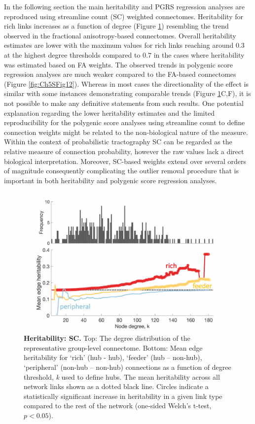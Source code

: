\newpage
In the following section the main heritability and PGRS regression analyses are reproduced using streamline count (SC) weighted connectomes. Heritability for rich links increases as a function of degree (Figure \ref{fig:Ch5SFig11}) resembling the trend observed in the fractional anisotropy-based connectomes. Overall heritability estimates are lower with the maximum values for rich links reaching around $0.3$ at the highest degree thresholds compared to $0.7$ in the cases where heritability was estimated based on FA weights. The observed trends in polygenic score regression analyses are much weaker compared to the FA-based connectomes (Figure \ref{fig:Ch5SFig12}). Whereas in most cases the directionality of the effect is similar with some instances demonstrating comparable trends (Figure \ref{fig:Ch5SFig11}C,F), it is not possible to make any definitive statements from such results. One potential explanation regarding the lower heritability estimates and the limited reproducibility for the polygenic score analyses using streamline count to define connection weights might be related to the non-biological nature of the measure. Within the context of probabilistic tractography SC can be regarded as the relative measure of connection probability, however the raw values lack a direct biological interpretation. Moreover, SC-based weights extend over several orders of magnitude consequently complicating the outlier removal procedure that is important in both heritability and polygenic score regression analyses. 

\begin{figure}[h!]
\begin{center}
\includegraphics[width=1\textwidth]{Chapter5/SFigure11.pdf}%
\end{center}
\caption{\textbf{Heritability: SC.} 
Top: The degree distribution of the representative group-level connectome. Bottom: Mean edge heritability for `rich' (hub - hub), `feeder' (hub – non-hub), `peripheral' (non-hub – non-hub) connections as a function of degree threshold, \textit{k} used to define hubs. The mean heritability across all network links shown as a dotted black line. Circles indicate a statistically significant increase in heritability in a given link type compared to the rest of the network (one-sided Welch's t-test, $p < 0.05$). }
\label{fig:Ch5SFig11}
\end{figure}

